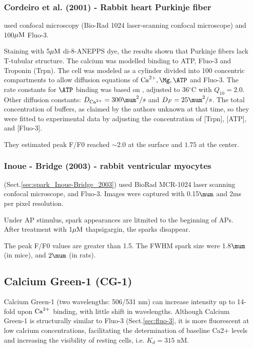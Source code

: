 \subsubsection{Cordeiro et al. (2001) - Rabbit heart Purkinje fiber}
\label{sec:cordeiro_2001}

\citep{cordeiro2001} used confocal microscopy (Bio-Rad 1024 laser-scanning confocal
microscope) and 100${\mu\text{M}}$ Fluo-3.

Staining with 5${\mu\text{M}}$ di-8-ANEPPS dye, the results shown that Purkinje fibers
lack T-tubular structure. The calcium was modelled binding to ATP, Fluo-3 and
Troponin (Trpn). The cell was modeled as a cylinder divided into 100 concentric
compartments to allow diffusion equations of $\Ca, \Mg, \ATP$ and Fluo-3. The
rate constants for $\ATP$ binding was based on \citep{baylor1998}, adjusted to
36$^\circ$C with $Q_{10}=2.0$. Other diffusion constants: $D_\Ca= 300 \mum^2/s$
and $D_F = 25\mum^2/s$.  The total concentration of buffers, as claimed by the
authors unknown at that time, so they were fitted to experimental data by
adjusting the concentration of [Trpn], [ATP], and [Fluo-3].

They estimated peak F/F0 reached $\sim 2.0$ at the surface and $1.75$ at the
center.

\subsubsection{Inoue - Bridge (2003) - rabbit ventricular myocytes}
\label{sec:Inoue-Bridge_2003}

\citep{inoue2003} (Sect.\ref{sec:spark_Inoue-Bridge_2003}) used BioRad MCR-1024
laser scanning confocal microscope, and Fluo-3. Images were captured with
0.15$\mum$ and 2ms per pixel resolution.

Under AP stimulus, spark appearances are litmited to the beginning of APs. After
treatment with 1${\mu\text{M}}$ thapsigargin, the sparks disappear.

The peak F/F0 values are greater than 1.5.  The FWHM spark size were 1.8$\mum$
(in mice), and $2\mum$ (in rats).



\subsection{Calcium Green-1 (CG-1)}
\label{sec:Green-1}
\label{sec:CG-1}

Calcium Green-1 (two wavelengths: 506/531 nm) can increase intensity up to
14-fold upon ${\text{Ca}^{2+}}$ binding, with little shift in wavelengths.
Although Calcium Green-1 is structurally similar to Fluo-3
(Sect.\ref{sec:fluo-3}, it is more fluorescent at low calcium concentrations,
facilitating the determination of baseline Ca2+ levels and increasing the
visibility of resting cells, i.e. $K_d = 315$ nM.

